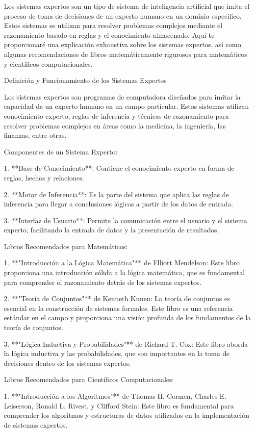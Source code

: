\documentclass{article}
\begin{document}
Los sistemas expertos son un tipo de sistema de inteligencia artificial que imita el proceso de toma de decisiones de un experto humano en un dominio específico. Estos sistemas se utilizan para resolver problemas complejos mediante el razonamiento basado en reglas y el conocimiento almacenado. Aquí te proporcionaré una explicación exhaustiva sobre los sistemas expertos, así como algunas recomendaciones de libros matemáticamente rigurosos para matemáticos y científicos computacionales.

 Definición y Funcionamiento de los Sistemas Expertos

Los sistemas expertos son programas de computadora diseñados para imitar la capacidad de un experto humano en un campo particular. Estos sistemas utilizan conocimiento experto, reglas de inferencia y técnicas de razonamiento para resolver problemas complejos en áreas como la medicina, la ingeniería, las finanzas, entre otras.

 Componentes de un Sistema Experto:

1. **Base de Conocimiento**: Contiene el conocimiento experto en forma de reglas, hechos y relaciones.
   
2. **Motor de Inferencia**: Es la parte del sistema que aplica las reglas de inferencia para llegar a conclusiones lógicas a partir de los datos de entrada.

3. **Interfaz de Usuario**: Permite la comunicación entre el usuario y el sistema experto, facilitando la entrada de datos y la presentación de resultados.

 Libros Recomendados para Matemáticos:

1. **"Introducción a la Lógica Matemática"** de Elliott Mendelson: Este libro proporciona una introducción sólida a la lógica matemática, que es fundamental para comprender el razonamiento detrás de los sistemas expertos.

2. **"Teoría de Conjuntos"** de Kenneth Kunen: La teoría de conjuntos es esencial en la construcción de sistemas formales. Este libro es una referencia estándar en el campo y proporciona una visión profunda de los fundamentos de la teoría de conjuntos.

3. **"Lógica Inductiva y Probabilidades"** de Richard T. Cox: Este libro aborda la lógica inductiva y las probabilidades, que son importantes en la toma de decisiones dentro de los sistemas expertos.

 Libros Recomendados para Científicos Computacionales:

1. **"Introducción a los Algoritmos"** de Thomas H. Cormen, Charles E. Leiserson, Ronald L. Rivest, y Clifford Stein: Este libro es fundamental para comprender los algoritmos y estructuras de datos utilizados en la implementación de sistemas expertos.
\end{document}
